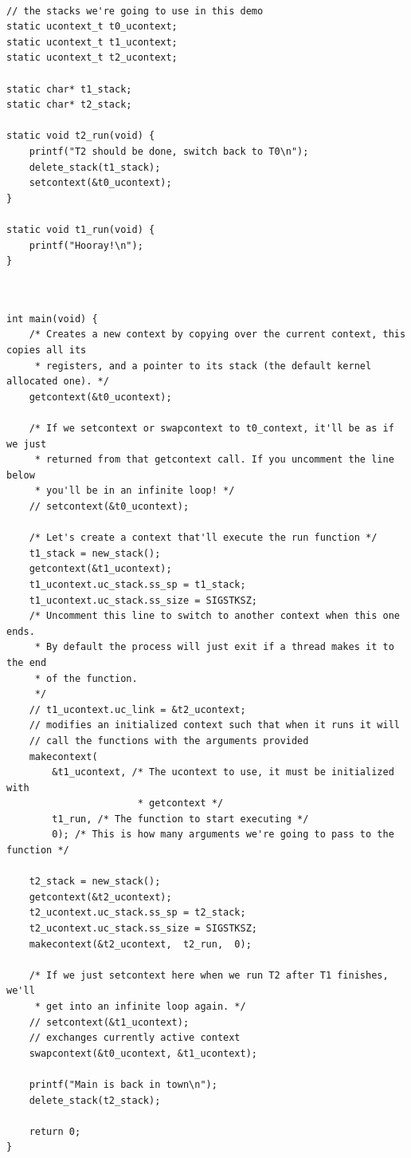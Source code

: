 \documentclass[../notes.tex]{subfiles}
\begin{document}
\begin{listing}[H]
\begin{verbatim}

// the stacks we're going to use in this demo
static ucontext_t t0_ucontext;
static ucontext_t t1_ucontext;
static ucontext_t t2_ucontext;

static char* t1_stack;
static char* t2_stack;

static void t2_run(void) {
    printf("T2 should be done, switch back to T0\n");
    delete_stack(t1_stack);
    setcontext(&t0_ucontext);
}

static void t1_run(void) {
    printf("Hooray!\n");
}


\end{verbatim}
\end{listing}

\begin{listing}[H]
\begin{verbatim}

int main(void) {
    /* Creates a new context by copying over the current context, this copies all its
     * registers, and a pointer to its stack (the default kernel allocated one). */
    getcontext(&t0_ucontext);

    /* If we setcontext or swapcontext to t0_context, it'll be as if we just
     * returned from that getcontext call. If you uncomment the line below
     * you'll be in an infinite loop! */
    // setcontext(&t0_ucontext);

    /* Let's create a context that'll execute the run function */
    t1_stack = new_stack();
    getcontext(&t1_ucontext);
    t1_ucontext.uc_stack.ss_sp = t1_stack;
    t1_ucontext.uc_stack.ss_size = SIGSTKSZ;
    /* Uncomment this line to switch to another context when this one ends.
     * By default the process will just exit if a thread makes it to the end
     * of the function.
     */
    // t1_ucontext.uc_link = &t2_ucontext;
    // modifies an initialized context such that when it runs it will
    // call the functions with the arguments provided
    makecontext(
        &t1_ucontext, /* The ucontext to use, it must be initialized with
                       * getcontext */
        t1_run, /* The function to start executing */
        0); /* This is how many arguments we're going to pass to the function */

    t2_stack = new_stack();
    getcontext(&t2_ucontext);
    t2_ucontext.uc_stack.ss_sp = t2_stack;
    t2_ucontext.uc_stack.ss_size = SIGSTKSZ;
    makecontext(&t2_ucontext,  t2_run,  0);

    /* If we just setcontext here when we run T2 after T1 finishes, we'll
     * get into an infinite loop again. */
    // setcontext(&t1_ucontext);
    // exchanges currently active context
    swapcontext(&t0_ucontext, &t1_ucontext);

    printf("Main is back in town\n");
    delete_stack(t2_stack);

    return 0;
}


\end{verbatim}
\end{listing}
\end{document}
